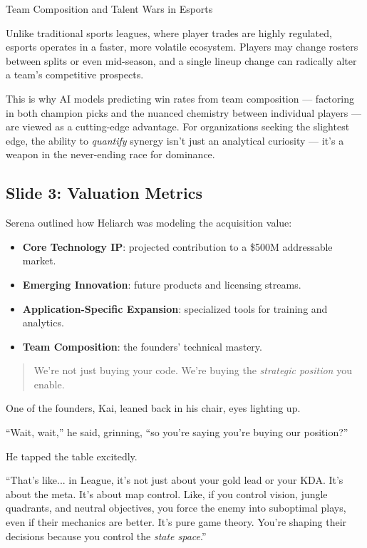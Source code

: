 \begin{HistoricalSidebar}{Team Composition and Talent Wars in Esports}
        \medskip
        
        Unlike traditional sports leagues, where player trades are highly regulated, esports operates in a faster, more volatile ecosystem. Players may change rosters between splits or even mid-season, and a single lineup change can radically alter a team’s competitive prospects.
        
        \medskip
        
        This is why AI models predicting win rates from team composition — factoring in both champion picks and the nuanced chemistry between individual players — are viewed as a cutting-edge advantage.  
        For organizations seeking the slightest edge, the ability to \textit{quantify} synergy isn’t just an analytical curiosity — it’s a weapon in the never-ending race for dominance.
\end{HistoricalSidebar}
    
\subsection{Slide 3: Valuation Metrics} 

    Serena outlined how Heliarch was modeling the acquisition value:
    \begin{itemize}
        \item \textbf{Core Technology IP}: projected contribution to a \$500M addressable market.
        \item \textbf{Emerging Innovation}: future products and licensing streams.
        \item \textbf{Application-Specific Expansion}: specialized tools for training and analytics.
        \item \textbf{Team Composition}: the founders’ technical mastery.
    \end{itemize}

\begin{quote}
    We’re not just buying your code. We’re buying the \textit{strategic position} you enable.
\end{quote}

One of the founders, Kai, leaned back in his chair, eyes lighting up.

“Wait, wait,” he said, grinning, “so you’re saying you’re buying our position?”

He tapped the table excitedly.

“That’s like... in League, it’s not just about your gold lead or your KDA. It's about the meta. It’s about map control. Like, if you control vision, jungle quadrants, and neutral objectives, you force the enemy into suboptimal plays, even if their mechanics are better. It’s pure game theory. You’re shaping their decisions because you control the \textit{state space}.”

